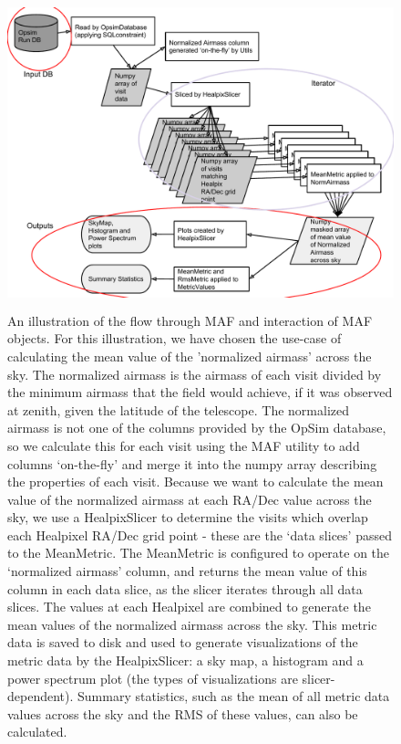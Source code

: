 \documentclass[]{spie}  %
\begin{document}
\begin{figure}
\centering
\includegraphics[height=9cm]{figures/maf_flowchart}
\caption[]
{ \label{fig:flowchart}
An illustration of the flow through MAF and interaction of MAF
objects. For this illustration, we have chosen the use-case of
calculating the mean value of the 'normalized airmass' across the
sky. The normalized airmass is the airmass of each visit divided by the minimum
airmass that the field would achieve, if it was observed at
zenith, given the latitude of the telescope. The normalized airmass is
not one of the columns provided by the OpSim database, so we calculate
this for each visit using the MAF utility to add columns
`on-the-fly' and merge it into the numpy array describing the
properties of each visit. Because we want to
calculate the mean value of the normalized airmass at each RA/Dec
value across the sky, we use a HealpixSlicer to determine the
visits which overlap each Healpixel RA/Dec grid point - these are
the `data slices' passed to the MeanMetric. The MeanMetric is
configured to operate on the `normalized airmass' column, and returns
the mean value of this column in each data slice, as the slicer
iterates through all data slices. The values at each
Healpixel are combined to generate the mean values of the
normalized airmass across the sky. This metric data is saved to disk and 
used to generate visualizations of the metric data by the
HealpixSlicer: a sky map, a histogram and a power spectrum plot (the types
of visualizations are slicer-dependent). Summary statistics, such as
the mean of all metric data values across the sky and the RMS of these
values, can also be calculated. }
\end{figure}
\end{document}
